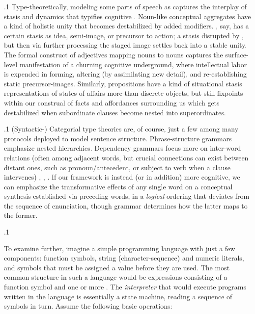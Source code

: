 \documentclass[11pt, twocolumn]{article}
\begin{document}
{{\p.1{%
Type-theoretically, modeling some parts of speech as
 captures the
interplay of stasis and dynamics that typifies
cognitive . Noun-like conceptual
aggregates have a kind of holistic unity that becomes
destabilized by added modifiers. , say,
has a certain stasis as idea, semi-image, or
precursor to action; a stasis disrupted by , but
then via further processing the staged image settles
back into a stable unity. The formal construct
of adjectives mapping nouns to nouns captures the
surface-level manifestation of a churning cognitive
underground, \pgl{}where intellectual labor is expended in
forming, altering (by assimilating new detail), and
re-establishing static precursor-images. Similarly, propositions
have a kind of situational stasis \mdash{} representations of
states of affairs more than
discrete objects, but still fixpoints within
our construal of facts and affordances surrounding us \mdash{}
which gets destabilized when subordinate clauses become nested into
superordinates.
}%

\p.1{%
(Syntactic-) Categorial type theories are, of course, just a few among many protocols
deployed to model sentence structure. Phrase-structure grammars emphasize
nested hierarchies. Dependency grammars
focus more on inter-word relations (often among adjacent words, but crucial
connections can exist between distant ones, such as pronoun/antecedent,
or subject to verb when a clause intervenes)
, , .
If our framework is instead (or in addition) more
cognitive, we can emphasize the transformative effects
of any single word on a conceptual synthesis established
via preceding words, in a \textit{logical} ordering that
deviates from the sequence of enunciation, though grammar
determines how the latter maps to the former.
}%

\p.1{%
To examine further, imagine a simple programming language with
just a few components: function symbols, string (character-sequence)
and numeric literals, and 
symbols that must be assigned a value before they are used.
The most common structure in such a language would be expressions consisting of a function
symbol and one or more . The \textit{interpreter}
that would execute programs written in the language is essentially
a state machine, reading a sequence of symbols
in turn. Assume the following basic operations: \upAdj{4pt}

}}}
\end{document}
